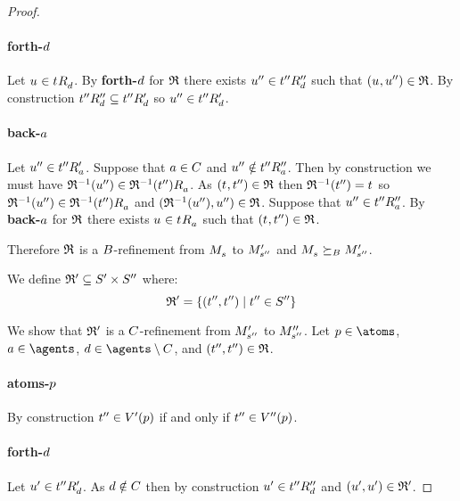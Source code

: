 \begin{proof}
\paragraph{forth-$d$}
Let $\kStateU \in \kSuccessorsD{\kStateT}$.
By {\bf forth-$d$} for $\mathfrak{R}$ there exists ${u}^{\prime\prime} \in {{t}^{\prime\prime}} {R^{\prime\prime}_{d}}$ such that $(\kStateU, \kStateUPP) \in \refinement$.
By construction ${{t}^{\prime\prime}} {R^{\prime\prime}_{d}} \subseteq {{t}^{\prime\prime}} {R^{\prime}_{d}}$ so ${u}^{\prime\prime} \in {{t}^{\prime\prime}} {R^{\prime}_{d}}$.

\paragraph{back-$a$}
Let ${u}^{\prime\prime} \in {{t}^{\prime\prime}} {R^{\prime}_{a}}$.
Suppose that $a \in C$ and ${u}^{\prime\prime} \notin {{t}^{\prime\prime}} {R^{\prime\prime}_{a}}$.
Then by construction we must have $\refinement^{-1}(\kStateUPP) \in \kSuccessorsA{\refinement^{-1}(\kStateTPP)}$.
As $(\kStateT, \kStateTPP) \in \refinement$ then $\refinement^{-1}(\kStateTPP) = \kStateT$ so $\refinement^{-1}(\kStateUPP) \in \kSuccessorsA{\refinement^{-1}(\kStateTPP)}$ and $(\mathfrak{R}^{-1}({u}^{\prime\prime}), {u}^{\prime\prime}) \in \mathfrak{R}$.
Suppose that ${u}^{\prime\prime} \in {{t}^{\prime\prime}} {R^{\prime\prime}_{a}}$.
By {\bf back-$a$} for $\mathfrak{R}$ there exists $\kStateU \in \kSuccessorsA{\kStateT}$ such that $(\kStateT, \kStateTPP) \in \refinement$.

Therefore $\mathfrak{R}$ is a $B$-refinement from $\kPModel{\kStateS}$ to ${M^{\prime}_{{s}^{\prime\prime}}}$ and $\kPModel{\kStateS} \simulatesBs \kPModelP{\kStateSPP}$.

We define $\mathfrak{R}' \subseteq {S^{\prime}} \times {S^{\prime\prime}}$ where:
$$
\mathfrak{R}' = \{({t}^{\prime\prime}, {t}^{\prime\prime}) \mid {t}^{\prime\prime} \in {S^{\prime\prime}}\}
$$

We show that $\mathfrak{R}'$ is a $C$-refinement from ${M^{\prime}_{{s}^{\prime\prime}}}$ to ${M^{\prime\prime}_{{s}^{\prime\prime}}}$.
Let $\atomP \in \atoms$, $\agentA \in \agents$, $\agentD \in \agents \setminus \agentsC$, and $({t}^{\prime\prime}, {t}^{\prime\prime}) \in \mathfrak{R}$.

\paragraph{atoms-$p$}
By construction ${t}^{\prime\prime} \in {V^{\prime}}(p)$ if and only if ${t}^{\prime\prime} \in {V^{\prime\prime}}(p)$.

\paragraph{forth-$d$}
Let ${u}^{\prime} \in {{t}^{\prime\prime}} {R^{\prime}_{d}}$.
As $d \notin C$ then by construction ${u}^{\prime} \in {{t}^{\prime\prime}} {R^{\prime\prime}_{d}}$ and $({u}^{\prime}, {u}^{\prime}) \in \mathfrak{R}'$.


\end{proof}
